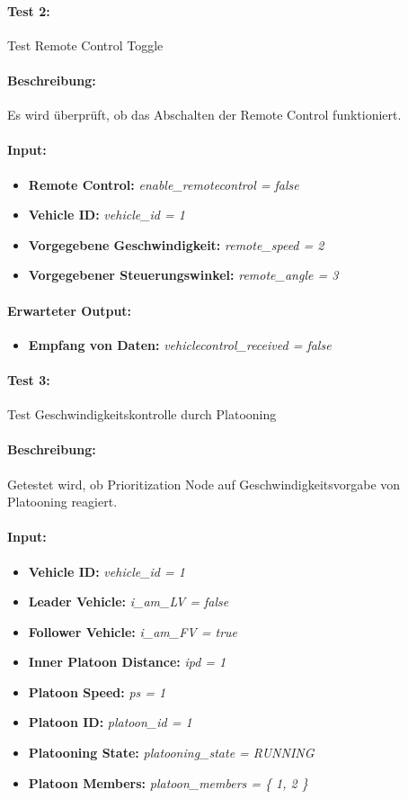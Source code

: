 \documentclass[a4paper, 12pt, titlepage]{scrartcl}
\begin{document}
				\paragraph{Test 2:}{Test Remote Control Toggle}
				\paragraph{Beschreibung:} Es wird überprüft, ob das Abschalten der Remote Control funktioniert.
				\paragraph{Input:}
				\begin{itemize} \itemsep-0.5em
					\item \textbf{Remote Control:} \emph{enable\_remotecontrol = false}
					\item \textbf{Vehicle ID:} \emph{vehicle\_id = 1}
					\item \textbf{Vorgegebene Geschwindigkeit:} \emph{remote\_speed = 2}
					\item \textbf{Vorgegebener Steuerungswinkel:} \emph{remote\_angle = 3}
				\end{itemize}
				\paragraph{Erwarteter Output:}
				\begin{itemize} \itemsep-0.5em
					\item \textbf{Empfang von Daten:} \emph{vehiclecontrol\_received = false}
				\end{itemize} 			
							
				\paragraph{Test 3:} {Test Geschwindigkeitskontrolle durch Platooning}
				\paragraph{Beschreibung:} Getestet wird, ob Prioritization Node auf Geschwindigkeitsvorgabe von Platooning reagiert. 
				\paragraph{Input:}
				\begin{itemize} \itemsep-0.5em
					\item \textbf{Vehicle ID:} \emph{vehicle\_id = 1}
					\item \textbf{Leader Vehicle:} \emph{i\_am\_LV = false}
					\item \textbf{Follower Vehicle:} \emph{i\_am\_FV = true}
					\item \textbf{Inner Platoon Distance:} \emph{ipd = 1}
					\item \textbf{Platoon Speed:} \emph{ps = 1}
					\item \textbf{Platoon ID:} \emph{platoon\_id = 1}
					\item \textbf{Platooning State:} \emph{platooning\_state = RUNNING}
					\item \textbf{Platoon Members:} \emph{platoon\_members = \{ 1, 2 \}}			
				\end{itemize}
\end{document}

